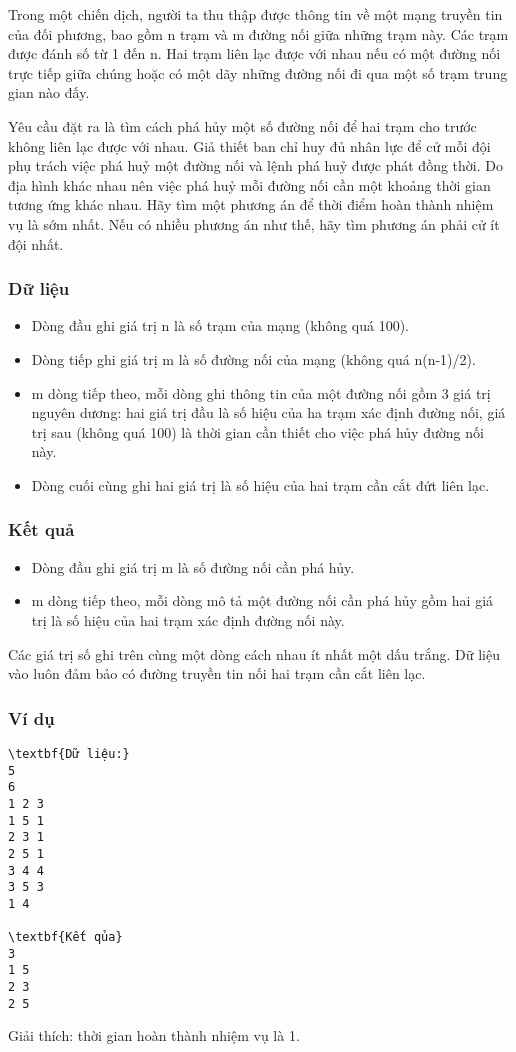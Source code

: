 



   Trong một chiến dịch, người ta thu thập được thông tin về một mạng truyền tin của đối phương, bao gồm n trạm và m đường nối giữa những trạm   này. Các trạm được đánh số từ 1 đến n. Hai trạm liên lạc được với nhau nếu có một đường nối trực tiếp giữa chúng hoặc có một dãy những đường nối   đi qua một số trạm trung gian nào đấy.  

   Yêu cầu đặt ra là tìm cách phá hủy một số đường nối để hai trạm cho trước không liên lạc được với nhau. Giả thiết ban chỉ huy đủ nhân lực để cử   mỗi đội phụ trách việc phá huỷ một đường nối và lệnh phá huỷ được phát đồng thời. Do địa hình khác nhau nên việc phá huỷ mỗi đường nối cần một   khoảng thời gian tương ứng khác nhau. Hãy tìm một phương án để thời điểm hoàn thành nhiệm vụ là sớm nhất. Nếu có nhiều phương án như thế, hãy tìm   phương án phải cử ít đội nhất.  

\subsubsection{   Dữ liệu  }
\begin{itemize}
	\item     Dòng đầu ghi giá trị n là số trạm của mạng (không quá 100).   
	\item     Dòng tiếp ghi giá trị m là số đường nối của mạng (không quá n(n-1)/2).   
	\item     m dòng tiếp theo, mỗi dòng ghi thông tin của một đường nối gồm 3 giá trị nguyên dương: hai giá trị đầu là số hiệu của ha trạm xác định đường nối,   giá trị sau (không quá 100) là thời gian cần thiết cho việc phá hủy đường nối này.   
	\item     Dòng cuối cùng ghi hai giá trị là số hiệu của hai trạm cần cắt đứt liên lạc.   
\end{itemize}

\subsubsection{   Kết quả  }
\begin{itemize}
	\item     Dòng đầu ghi giá trị m là số đường nối cần phá hủy.   
	\item     m dòng tiếp theo, mỗi dòng mô tả một đường nối cần phá hủy gồm hai giá trị là số hiệu của hai trạm xác định đường nối này.   
\end{itemize}

   Các giá trị số ghi trên cùng một dòng cách nhau ít nhất một dấu trắng. Dữ liệu vào luôn đảm bảo có đường truyền tin nối hai trạm cần cắt liên lạc.  

\subsubsection{   Ví dụ  }
\begin{verbatim}
\textbf{Dữ liệu:}
5
6
1 2 3
1 5 1
2 3 1
2 5 1
3 4 4
3 5 3
1 4

\textbf{Kết qủa}
3
1 5
2 3
2 5
\end{verbatim}

   Giải thích: thời gian hoàn thành nhiệm vụ là 1.  